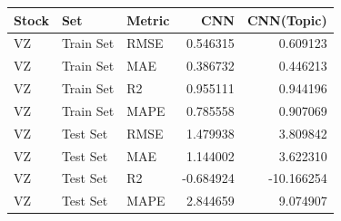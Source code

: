 \begin{tabular}{lllrr}
\toprule
Stock & Set & Metric & CNN & CNN(Topic) \\
\midrule
VZ & Train Set & RMSE & 0.546315 & 0.609123 \\
VZ & Train Set & MAE & 0.386732 & 0.446213 \\
VZ & Train Set & R2 & 0.955111 & 0.944196 \\
VZ & Train Set & MAPE & 0.785558 & 0.907069 \\
VZ & Test Set & RMSE & 1.479938 & 3.809842 \\
VZ & Test Set & MAE & 1.144002 & 3.622310 \\
VZ & Test Set & R2 & -0.684924 & -10.166254 \\
VZ & Test Set & MAPE & 2.844659 & 9.074907 \\
\bottomrule
\end{tabular}
